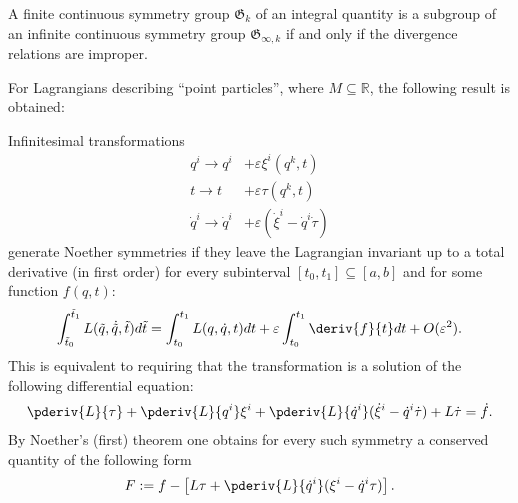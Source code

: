     \begin{theorem}\label{var:noether_third_theorem}
        A finite continuous symmetry group $\mathfrak{G}_k$ of an integral quantity is a subgroup of an infinite continuous symmetry group $\mathfrak{G}_{\infty,k}$ if and only if the divergence relations are improper.
    \end{theorem}

    For Lagrangians describing ``point particles'', where $M\subseteq\mathbb{R}$, the following result is obtained:
    \begin{example}
        Infinitesimal transformations
        \begin{align*}
            q^i\longrightarrow q^i& + \varepsilon\xi^i(q^k,t)\\
            t\longrightarrow t& + \varepsilon\tau(q^k,t)\\
            \dot{q}^i\longrightarrow\dot{q}^i& + \varepsilon(\dot{\xi}^i - \dot{q}^i\dot{\tau})
        \end{align*}
        generate Noether symmetries if they leave the Lagrangian invariant up to a total derivative (in first order) for every subinterval $[t_0,t_1]\subseteq[a,b]$ and for some function $f(q,t)$:
        \begin{gather}
            \int_{\tilde{t}_0}^{\tilde{t}_1}L(\tilde{q},\dot{\tilde{q}}, \tilde{t})d\tilde{t} = \int_{t_0}^{t_1}L(q,\dot{q},t)dt + \varepsilon\int_{t_0}^{t_1}\deriv{f}{t}dt + O(\varepsilon^2).
        \end{gather}
        This is equivalent to requiring that the transformation is a solution of the following differential equation:
        \begin{gather}
            \pderiv{L}{\tau} + \pderiv{L}{q^i}\xi^i + \pderiv{L}{\dot{q}^i}(\dot{\xi}^i - \dot{q}^i\dot{\tau}) + L\dot{\tau} = \dot{f}.
        \end{gather}
        By Noether's (first) theorem one obtains for every such symmetry a conserved quantity of the following form
        \begin{gather}
            F := f - \left[L\tau + \pderiv{L}{\dot{q}^i}(\xi^i - \dot{q}^i\tau)\right].
        \end{gather}
    \end{example}

